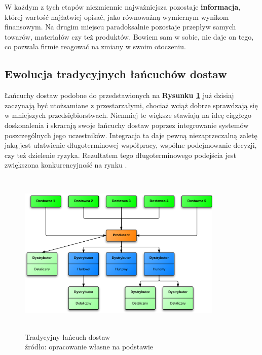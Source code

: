 	W każdym z tych etapów niezmiennie najważniejsza 
	pozostaje \textbf{informacja}, której wartość najłatwiej
	opisać, jako równoważną wymiernym wynikom finansowym. 
	Na drugim miejscu paradoksalnie pozostaje przepływ
	samych towarów, materiałów czy też produktów. 
	Bowiem sam w sobie, nie daje on tego, co pozwala
	firmie reagować na zmiany w swoim otoczeniu.
	
	\subsection{Ewolucja tradycyjnych łańcuchów dostaw}
		\hspace{15pt}Łańcuchy dostaw podobne do przedstawionych na \textbf{Rysunku \ref{fig:simple_supply_chain}} już dzisiaj 
		zaczynają być utożsamiane z przestarzałymi, chociaż
		wciąż dobrze sprawdzają się w mniejszych przedsiębiorstwach. 
		Niemniej te większe stawiają na ideę ciągłego doskonalenia
		i skracają swoje łańcuchy dostaw poprzez integrowanie 
		systemów poszczególnych jego uczestników.
		Integracja ta daje pewną niezaprzeczalną zaletę jaką jest ułatwienie 
		długoterminowej współpracy, wspólne podejmowanie decyzji, czy też
		dzielenie ryzyka. Rezultatem tego długoterminowego
		podejścia jest zwiększona konkurencyjność na rynku \cite{zarzadzanie_lancuchem_dostaw_w_dobie_gospodarki_elektroniczej}.\\
		
		\begin{figure}[h]
			\centering
			\includegraphics[width=370px, height=300px]{images/BasicSupplyChain}
			\caption[Schemat budowy prostego łańcucha dostaw]{
				Tradycyjny łańcuch dostaw \\
				źródło: opracowanie własne na podstawie \cite{zarzadzanie_lancuchem_dostaw_w_dobie_gospodarki_elektroniczej}
			}
			\label{fig:simple_supply_chain}
		\end{figure}		
		
